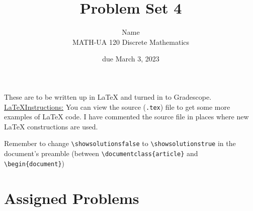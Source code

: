 \documentclass{article}
\title{Problem Set 4}
\author{%
    Name
\\  MATH-UA 120 Discrete Mathematics
}
\date{due March 3, 2023}
\newif\ifshowsolutions
\newcommand{\danger}{\marginpar[\hfill\dbend]{\dbend\hfill}}
\theoremstyle{definition}
\begin{document}
\maketitle



These are to be written up in \LaTeX{} and turned in to Gradescope.\\



\ifshowsolutions
    \SetupExSheets{solution/print=true}
\else
    \danger
 \underline{ \LaTeX  Instructions:}  You can view the source (\texttt{.tex}) file to get some more examples of \LaTeX{} code.  I have commented the source file in places where new \LaTeX{} constructions are used.
  
  Remember to change \verb|\showsolutionsfalse| to \verb|\showsolutionstrue|
    in the document's preamble 
    (between \verb|\documentclass{article}| and \verb|\begin{document}|)
\fi

\section*{Assigned Problems}
\end{document}
